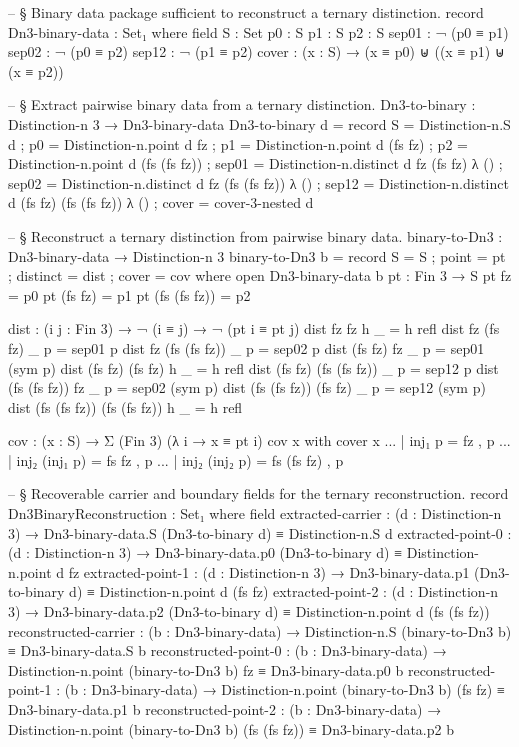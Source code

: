 \documentclass[11pt]{article}
\begin{document}
\begin{code}
-- § Binary data package sufficient to reconstruct a ternary distinction.
record Dn3-binary-data : Set₁ where
  field
    S     : Set
    p0    : S
    p1    : S
    p2    : S
    sep01 : ¬ (p0 ≡ p1)
    sep02 : ¬ (p0 ≡ p2)
    sep12 : ¬ (p1 ≡ p2)
    cover : (x : S) → (x ≡ p0) ⊎ ((x ≡ p1) ⊎ (x ≡ p2))

  -- § Extract pairwise binary data from a ternary distinction.
Dn3-to-binary : Distinction-n 3 → Dn3-binary-data
Dn3-to-binary d = record
  { S     = Distinction-n.S d
  ; p0    = Distinction-n.point d fz
  ; p1    = Distinction-n.point d (fs fz)
  ; p2    = Distinction-n.point d (fs (fs fz))
  ; sep01 = Distinction-n.distinct d fz (fs fz) λ ()
  ; sep02 = Distinction-n.distinct d fz (fs (fs fz)) λ ()
  ; sep12 = Distinction-n.distinct d (fs fz) (fs (fs fz)) λ ()
  ; cover = cover-3-nested d
  }

-- § Reconstruct a ternary distinction from pairwise binary data.
binary-to-Dn3 : Dn3-binary-data → Distinction-n 3
binary-to-Dn3 b = record
  { S        = S
  ; point    = pt
  ; distinct = dist
  ; cover    = cov
  }
  where
    open Dn3-binary-data b
    pt : Fin 3 → S
    pt fz             = p0
    pt (fs fz)        = p1
    pt (fs (fs fz))   = p2

    dist : (i j : Fin 3) → ¬ (i ≡ j) → ¬ (pt i ≡ pt j)
    dist fz             fz             h _ = h refl
    dist fz             (fs fz)        _ p = sep01 p
    dist fz             (fs (fs fz))   _ p = sep02 p
    dist (fs fz)        fz             _ p = sep01 (sym p)
    dist (fs fz)        (fs fz)        h _ = h refl
    dist (fs fz)        (fs (fs fz))   _ p = sep12 p
    dist (fs (fs fz))   fz             _ p = sep02 (sym p)
    dist (fs (fs fz))   (fs fz)        _ p = sep12 (sym p)
    dist (fs (fs fz))   (fs (fs fz))   h _ = h refl

    cov : (x : S) → Σ (Fin 3) (λ i → x ≡ pt i)
    cov x with cover x
    ... | inj₁ p          = fz , p
    ... | inj₂ (inj₁ p)   = fs fz , p
    ... | inj₂ (inj₂ p)   = fs (fs fz) , p

-- § Recoverable carrier and boundary fields for the ternary reconstruction.
record Dn3BinaryReconstruction : Set₁ where
  field
    extracted-carrier   : (d : Distinction-n 3) →
      Dn3-binary-data.S (Dn3-to-binary d) ≡ Distinction-n.S d
    extracted-point-0   : (d : Distinction-n 3) →
      Dn3-binary-data.p0 (Dn3-to-binary d) ≡ Distinction-n.point d fz
    extracted-point-1   : (d : Distinction-n 3) →
      Dn3-binary-data.p1 (Dn3-to-binary d) ≡ Distinction-n.point d (fs fz)
    extracted-point-2   : (d : Distinction-n 3) →
      Dn3-binary-data.p2 (Dn3-to-binary d) ≡ Distinction-n.point d (fs (fs fz))
    reconstructed-carrier : (b : Dn3-binary-data) →
      Distinction-n.S (binary-to-Dn3 b) ≡ Dn3-binary-data.S b
    reconstructed-point-0 : (b : Dn3-binary-data) →
      Distinction-n.point (binary-to-Dn3 b) fz ≡ Dn3-binary-data.p0 b
    reconstructed-point-1 : (b : Dn3-binary-data) →
      Distinction-n.point (binary-to-Dn3 b) (fs fz) ≡ Dn3-binary-data.p1 b
    reconstructed-point-2 : (b : Dn3-binary-data) →
      Distinction-n.point (binary-to-Dn3 b) (fs (fs fz)) ≡ Dn3-binary-data.p2 b


\end{code}
\end{document}

